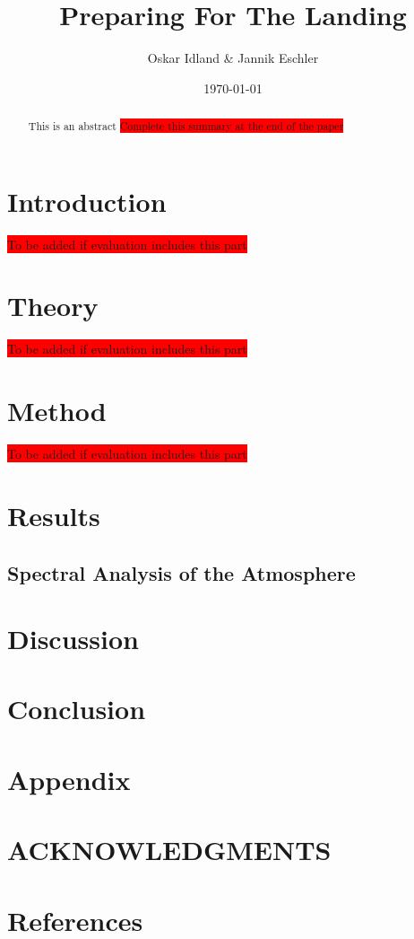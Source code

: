 \documentclass[reprint,english,notitlepage]{revtex4-2}
\begin{document}
\title{Preparing For The Landing}
\author{Oskar Idland \& Jannik Eschler}
\date{\today}

\begin{abstract}
    This is an abstract \colorbox{red}{Complete this summary at the end of the paper}
\end{abstract}
\maketitle
\section{Introduction} \label{sec:introduction}
\colorbox{red}{To be added if evaluation includes this part}
\section{Theory} \label{sec: theory}
\colorbox{red}{To be added if evaluation includes this part}
\section{Method} \label{sec: method}
\colorbox{red}{To be added if evaluation includes this part}

\section{Results} \label{sec: results}

\subsection{Spectral Analysis of the Atmosphere}


\section{Discussion} \label{sec: discussion}

\section{Conclusion} \label{sec: conclusion}

\section{Appendix} \label{sec: appendix}

\section*{ACKNOWLEDGMENTS}

\section*{References} \label{sec: references}
\end{document}
